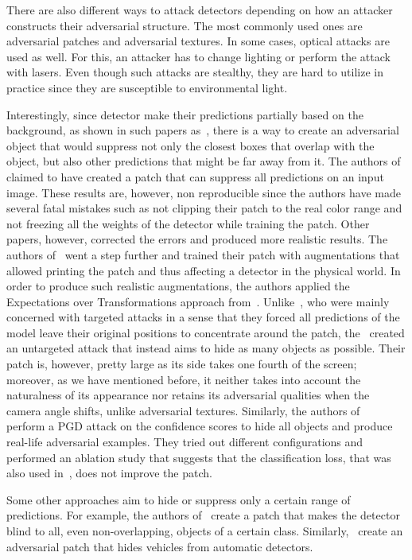 There are also different ways to attack detectors depending on how an attacker constructs their adversarial structure.
The most commonly used ones are adversarial patches and adversarial textures.
In some cases, optical attacks are used as well.
For this, an attacker has to change lighting or perform the attack with lasers. 
Even though such attacks are stealthy, they are hard to utilize in practice since they are susceptible to environmental light.

Interestingly, since detector make their predictions partially based on the background, as shown in such papers as~\cite{det_context_emp_study, dec_context_evaluation, det_context_attentive}, there is a way to create an adversarial object that would suppress not only the closest boxes that overlap with the object, but also other predictions that might be far away from it.
The authors of~\cite{dpatch} claimed to have created a patch that can suppress all predictions on an input image.
These results are, however, non reproducible since the authors have made several fatal mistakes such as not clipping their patch to the real color range and not freezing all the weights of the detector while training the patch.
Other papers, however, corrected the errors and produced more realistic results.
The authors of~\cite{physical_patch} went a step further and trained their patch with augmentations that allowed printing the patch and thus affecting a detector in the physical world.
In order to produce such realistic augmentations, the authors applied the Expectations over Transformations approach from~\cite{eot}.
Unlike~\cite{dpatch}, who were mainly concerned with targeted attacks in a sense that they forced all predictions of the model leave their original positions to concentrate around the patch, the~\cite{physical_patch} created an untargeted attack that instead aims to hide as many objects as possible.
Their patch is, however, pretty large as its side takes one fourth of the screen; moreover, as we have mentioned before, it neither takes into account the naturalness of its appearance nor retains its adversarial qualities when the camera angle shifts, unlike adversarial textures.
Similarly, the authors of~\cite{patch_conf_pgd} perform a PGD attack on the confidence scores to hide all objects and produce real-life adversarial examples.
They tried out different configurations and performed an ablation study that suggests that the classification loss, that was also used in~\cite{physical_patch}, does not improve the patch.

Some other approaches aim to hide or suppress only a certain range of predictions.
For example, the authors of~\cite{spatial_context} create a patch that makes the detector blind to all, even non-overlapping, objects of a certain class.
Similarly,~\cite{aerial_patch} create an adversarial patch that hides vehicles from automatic detectors.

